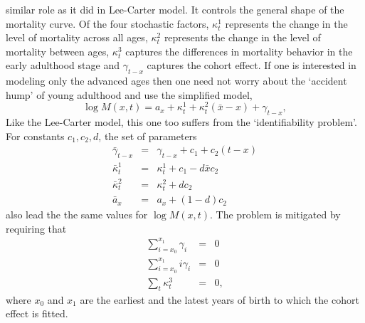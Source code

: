 \documentclass{article}
\numberwithin{equation}{section}
\begin{document}
similar role as it did in Lee-Carter model. It controls the general shape
of the mortality curve. Of the four stochastic factors, $\kappa_t^1$
represents the change in the level of mortality across all ages, $\kappa_t^2$
represents the change in the level of mortality between ages, $\kappa_t^3$
captures the differences in mortality behavior in the early adulthood stage
and $\gamma_{t-x}$ captures the cohort effect. If one is interested in 
modeling only the advanced ages then one need not worry about the `accident
hump' of young adulthood and use the simplified model,
\begin{equation}\label{s9e4}
\log M(x,t) = a_x + \kappa^1_t + \kappa^2_t(\bar{x} - x) + \gamma_{t-x},
\end{equation}
Like the Lee-Carter model, this one too suffers from the `identifiability
problem'. For constants $c_1, c_2, d$, the set of parameters
\begin{eqnarray*}
\bar{\gamma}_{t-x} &=& \gamma_{t-x} + c_1 + c_2(t - x) \\
\bar{\kappa}_t^1 &=& \kappa^1_t + c_1 - d\bar{x}c_2 \\
\bar{\kappa}_t^2 &=& \kappa^2_t + dc_2 \\
\bar{a}_x &=& a_x + (1 - d)c_2
\end{eqnarray*}
also lead the the same values for $\log M(x, t)$. The problem is mitigated 
by requiring that 
\begin{eqnarray*}
\sum_{i=x_0}^{x_1} \gamma_i &=& 0 \\
\sum_{i=x_0}^{x_1} i\gamma_i &=& 0 \\
\sum_t\kappa_t^3 &=& 0,
\end{eqnarray*}
where $x_0$ and $x_1$ are the earliest and the latest years of birth to which
the cohort effect is fitted. 
\end{document}
